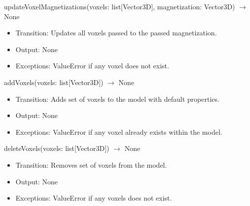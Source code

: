 \documentclass[12pt, titlepage]{article}
\begin{document}
updateVoxelMagnetizations(voxels: list[Vector3D], magnetization: Vector3D) $\rightarrow$ None
\begin{itemize}
  \item Transition: Updates all voxels passed to the passed magnetization.
  \item Output: None
  \item Exceptions: ValueError if any voxel does not exist.
\end{itemize}

addVoxels(voxels: list[Vector3D]) $\rightarrow$ None
\begin{itemize}
  \item Transition: Adds set of voxels to the model with default properties.
  \item Output: None
  \item Exceptions: ValueError if any voxel already exists within the model.
\end{itemize}

deleteVoxels(voxels: list[Vector3D]) $\rightarrow$ None
\begin{itemize}
  \item Transition: Removes set of voxels from the model.
  \item Output: None
  \item Exceptions: ValueError if any voxels does not exist.
\end{itemize}



\end{document}
